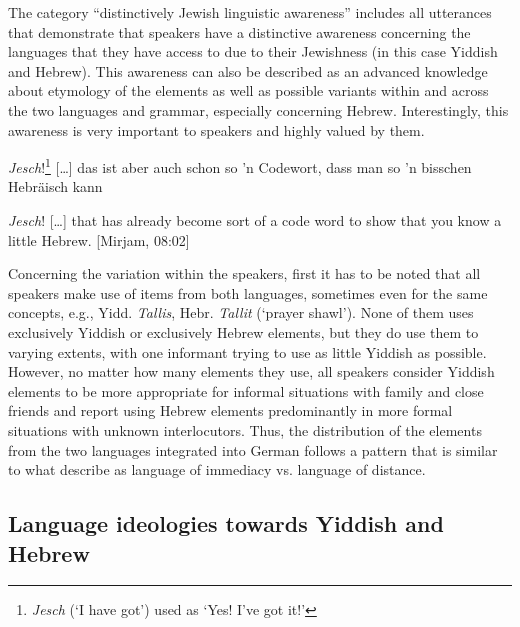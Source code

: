 \documentclass[output=paper]{langscibook}
\begin{document}
The category “distinctively Jewish linguistic awareness” includes all utterances that demonstrate that speakers have a distinctive awareness concerning the languages that they have access to due to their Jewishness (in this case Yiddish and Hebrew). This awareness can also be described as an advanced knowledge about etymology of the elements as well as possible variants within and across the two languages and grammar, especially concerning Hebrew. Interestingly, this awareness is very important to speakers and highly valued by them.

\ea%
\label{ex:jahns:3}


\textit{Jesch}!\footnote{\textit{Jesch} (‘I have got’) used as ‘Yes! I’ve got it!’} […] das ist aber auch schon so 'n Codewort, dass man so 'n bisschen Hebräisch kann 


\textit{Jesch}! […] that has already become sort of a code word to show that you know a little Hebrew. [Mirjam, 08:02]
\z

Concerning the variation within the speakers, first it has to be noted that all speakers make use of items from both languages, sometimes even for the same concepts, e.g., Yidd. \textit{Tallis}, Hebr. \textit{Tallit} (‘prayer shawl’). None of them uses exclusively Yiddish or exclusively Hebrew elements, but they do use them to varying extents, with one informant trying to use as little Yiddish as possible. However, no matter how many elements they use, all speakers consider Yiddish elements to be more appropriate for informal situations with family and close friends and report using Hebrew elements predominantly in more formal situations with unknown interlocutors. Thus, the distribution of the elements from the two languages integrated into German follows a pattern that is similar to what \citet{KochOesterreicher1986} describe as language of immediacy vs. language of distance.

\subsection{Language ideologies towards Yiddish and Hebrew}
\end{document}
